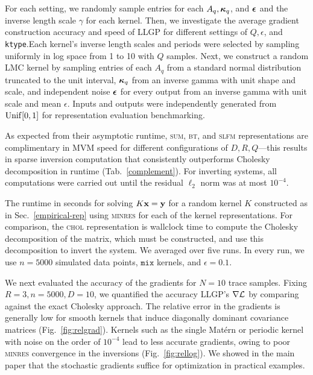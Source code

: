 \documentclass{article}
\begin{document}
For each setting, we randomly sample entries for each $A_q,{\boldsymbol\kappa}_q$, and ${\boldsymbol\epsilon}$ and the inverse length scale $\gamma$ for each kernel. Then, we investigate the average gradient construction accuracy and speed of LLGP for different settings of $Q,\epsilon$, and \texttt{ktype}.Each kernel's inverse length scales and periods were selected by sampling uniformly in log space from 1 to 10 with $Q$ samples. Next, we construct a random LMC kernel by sampling entries of each $A_q$ from a standard normal distribution truncated to the unit interval, ${\boldsymbol\kappa}_q$ from an inverse gamma with unit shape and scale, and independent noise ${\boldsymbol\epsilon}$ for every output from an inverse gamma with unit scale and mean $\epsilon$. Inputs and outputs were independently generated from $\operatorname{Unif}[0,1]$ for representation evaluation benchmarking.

As expected from their asymptotic runtime, \textsc{sum}, \textsc{bt}, and \textsc{slfm} representations are complimentary in MVM speed for different configurations of $D,R,Q$---this results in sparse inversion computation that consistently outperforms Cholesky decomposition in runtime (Tab.~\ref{complement}).
For inverting systems, all computations were carried out until the residual $\ell_2$ norm was at most $10^{-4}$.
\begin{table}[!ht]
  \caption{The runtime in seconds for solving $K\textbf{x}=\textbf{y}$ for a random kernel $K$ constructed as in Sec.~\ref{empirical-rep} using \textsc{minres} for each of the kernel representations. For comparison, the \textsc{chol} representation is wallclock time to compute the Cholesky decomposition of the matrix, which must be constructed, and use this decomposition to invert the system. We averaged over five runs. In every run, we use $n=5000$ simulated data points, $\texttt{mix}$ kernels, and $\epsilon=0.1$.
}
\label{complement}
\begin{center}
  \begin{small}
    
\end{small}
\end{center}
\end{table}

We next evaluated the accuracy of the gradients for $N=10$ trace samples. Fixing $R=3,n=5000,D=10$, we quantified the accuracy LLGP's $\nabla\mathcal{L}$ by comparing against the exact Cholesky approach. The relative error in the gradients is generally low for smooth kernels that induce diagonally dominant covariance matrices (Fig.~\ref{fig:relgrad}). Kernels such as the single Mat\'{e}rn or periodic kernel with noise on the order of $10^{-4}$ lead to less accurate gradients, owing to poor \textsc{minres} convergence in the inversions (Fig.~\ref{fig:rellog}). We showed in the main paper that the stochastic gradients suffice for optimization in practical examples.
\end{document}
